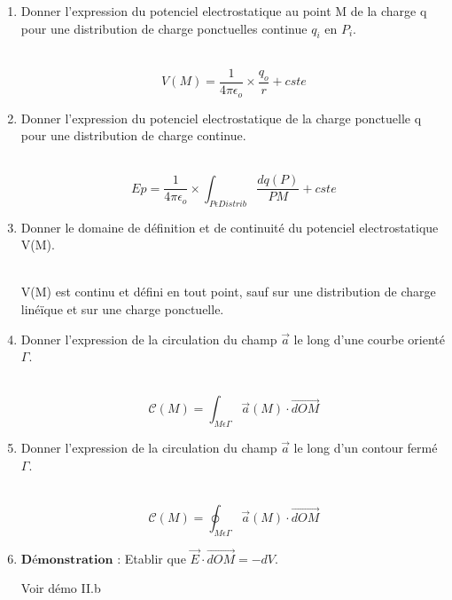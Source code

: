 \begin{enumerate}[label=\arabic{enumi} - , left=0pt, itemsep=1em]
    \item Donner l'expression du potenciel electrostatique au point M de la charge q pour une distribution de charge ponctuelles continue $q_i$ en $P_i$. \par
    \begin{solution} \\
        \[ V(M) = \frac{1}{4 \pi \epsilon_o} \times \frac{q_o}{r} + cste\]
    \end{solution}
    
    \item Donner l'expression du potenciel electrostatique de la charge ponctuelle q pour une distribution de charge continue. \par
    \begin{solution} \\
        \[ Ep = \frac{1}{4 \pi \epsilon_o} \times \int_{P \epsilon Distrib} \frac{dq(P)}{PM} + cste\]
    \end{solution}

    \item Donner le domaine de définition et de continuité du potenciel electrostatique V(M). \par
    \begin{solution} \\
        V(M) est continu et défini en tout point, sauf sur une distribution de charge linéïque et sur une charge ponctuelle.
    \end{solution}

    \item Donner l'expression de la circulation du champ $\vec{a}$ le long d'une courbe orienté $\Gamma$. \par
    \begin{solution} \\
        \[ \mathcal{C} (M) = \int_{M \epsilon \Gamma} \vec{a}(M) \cdot \vec{dOM} \]
    \end{solution}

    \item Donner l'expression de la circulation du champ $\vec{a}$ le long d'un contour fermé $\Gamma$. \par
    \begin{solution} \\
        \[ \mathcal{C} (M) = \oint_{M \epsilon \Gamma} \vec{a}(M) \cdot \vec{dOM} \]
    \end{solution}

    \item  $\textbf{Démonstration :}$ Etablir que $\vec{E} \cdot \vec{dOM} = -dV$.\par
    \begin{solution}
         Voir démo II.b


\end{solution}
\end{enumerate}
